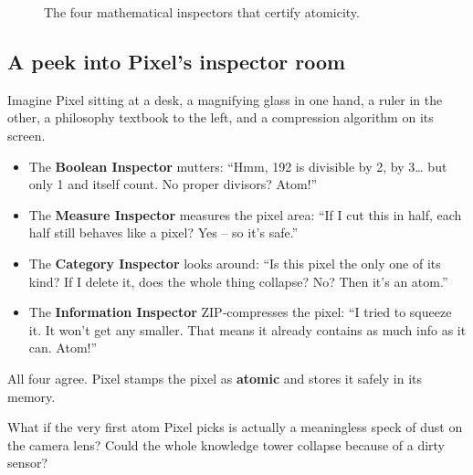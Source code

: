 \begin{figure}[ht]
\centering
{}
\caption{The four mathematical inspectors that certify atomicity.}
\label{fig:atomicity}
\end{figure}

\subsection*{A peek into Pixel’s inspector room}

Imagine Pixel sitting at a desk, a magnifying glass in one hand, a
ruler in the other, a philosophy textbook to the left, and a
compression algorithm on its screen.

\begin{itemize}
    \item The \textbf{Boolean Inspector} mutters: “Hmm, 192 is divisible
    by 2, by 3… but only 1 and itself count.  No proper divisors?  Atom!”
    \item The \textbf{Measure Inspector} measures the pixel area: “If I
    cut this in half, each half still behaves like a pixel?  Yes – so
    it’s safe.”
    \item The \textbf{Category Inspector} looks around: “Is this pixel
    the only one of its kind?  If I delete it, does the whole thing
    collapse?  No?  Then it’s an atom.”
    \item The \textbf{Information Inspector} ZIP‑compresses the pixel:
    “I tried to squeeze it.  It won’t get any smaller.  That means it
    already contains as much info as it can.  Atom!”
\end{itemize}

All four agree.  Pixel stamps the pixel as \textbf{atomic} and stores
it safely in its memory.

\begin{tcolorbox}[colback=orange!5, colframe=orange!60, title=\textbf{What if...?}]
What if the very first atom Pixel picks is actually a meaningless
speck of dust on the camera lens?  Could the whole knowledge tower
collapse because of a dirty sensor?
\end{tcolorbox}